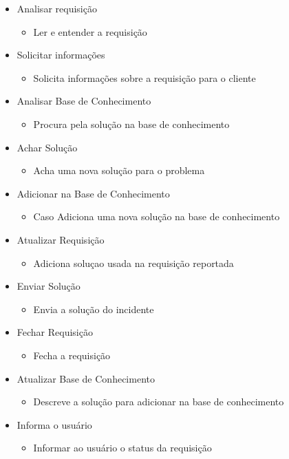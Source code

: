 \begin{itemize}[noitemsep]
	\item Analisar requisição
	\begin{itemize}
		\item Ler e entender a requisição
	\end{itemize}
	\item Solicitar informações
		\begin{itemize}
			\item Solicita informações sobre a requisição para o cliente
		\end{itemize}
	\item Analisar Base de Conhecimento
		\begin{itemize}
			\item Procura pela solução na base de conhecimento
		\end{itemize}
	\item Achar Solução
		\begin{itemize}
			\item Acha uma nova solução para o problema
		\end{itemize}
	\item Adicionar na Base de Conhecimento
			\begin{itemize}
				\item Caso Adiciona uma nova solução na base de conhecimento
			\end{itemize}
	\item Atualizar Requisição
		\begin{itemize}
			\item Adiciona soluçao usada na requisição reportada
		\end{itemize}
	\item Enviar Solução
			\begin{itemize}
				\item Envia a solução do incidente
			\end{itemize}
	\item Fechar Requisição
			\begin{itemize}
				\item Fecha a requisição
			\end{itemize}
	\item Atualizar Base de Conhecimento
		\begin{itemize}
			\item Descreve a solução para adicionar na base de conhecimento
		\end{itemize}
	\item Informa o usuário
			\begin{itemize}
				\item Informar ao usuário o status da requisição
			\end{itemize}
\end{itemize}
\clearpage
